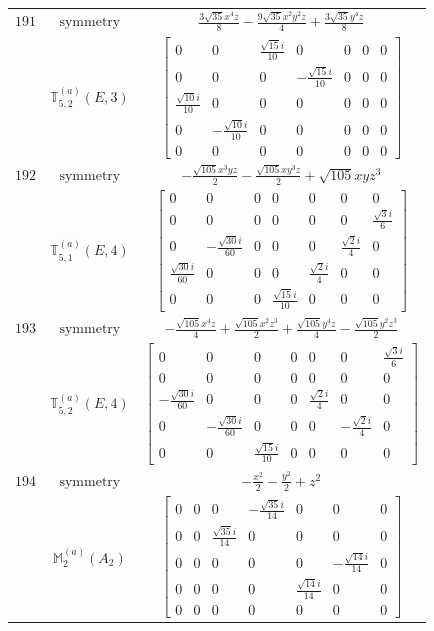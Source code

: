 \documentclass[fleqn,8pt,landscape]{jsarticle}
\begin{document}
\begin{longtable}{ccc}
$ 191 $ & $ \text{symmetry} $ & $ \frac{3 \sqrt{35} x^{4} z}{8} - \frac{9 \sqrt{35} x^{2} y^{2} z}{4} + \frac{3 \sqrt{35} y^{4} z}{8} $ \\
$  $ & $ \mathbb{T}_{5,2}^{(a)}(E,3) $ & $ \begin{bmatrix} 0 & 0 & \frac{\sqrt{15} i}{10} & 0 & 0 & 0 & 0 \\ 0 & 0 & 0 & - \frac{\sqrt{15} i}{10} & 0 & 0 & 0 \\ \frac{\sqrt{10} i}{10} & 0 & 0 & 0 & 0 & 0 & 0 \\ 0 & - \frac{\sqrt{10} i}{10} & 0 & 0 & 0 & 0 & 0 \\ 0 & 0 & 0 & 0 & 0 & 0 & 0 \end{bmatrix} $ \\ \hline
$ 192 $ & $ \text{symmetry} $ & $ - \frac{\sqrt{105} x^{3} y z}{2} - \frac{\sqrt{105} x y^{3} z}{2} + \sqrt{105} x y z^{3} $ \\
$  $ & $ \mathbb{T}_{5,1}^{(a)}(E,4) $ & $ \begin{bmatrix} 0 & 0 & 0 & 0 & 0 & 0 & 0 \\ 0 & 0 & 0 & 0 & 0 & 0 & \frac{\sqrt{3} i}{6} \\ 0 & - \frac{\sqrt{30} i}{60} & 0 & 0 & 0 & \frac{\sqrt{2} i}{4} & 0 \\ \frac{\sqrt{30} i}{60} & 0 & 0 & 0 & \frac{\sqrt{2} i}{4} & 0 & 0 \\ 0 & 0 & 0 & \frac{\sqrt{15} i}{10} & 0 & 0 & 0 \end{bmatrix} $ \\ \hline
$ 193 $ & $ \text{symmetry} $ & $ - \frac{\sqrt{105} x^{4} z}{4} + \frac{\sqrt{105} x^{2} z^{3}}{2} + \frac{\sqrt{105} y^{4} z}{4} - \frac{\sqrt{105} y^{2} z^{3}}{2} $ \\
$  $ & $ \mathbb{T}_{5,2}^{(a)}(E,4) $ & $ \begin{bmatrix} 0 & 0 & 0 & 0 & 0 & 0 & \frac{\sqrt{3} i}{6} \\ 0 & 0 & 0 & 0 & 0 & 0 & 0 \\ - \frac{\sqrt{30} i}{60} & 0 & 0 & 0 & \frac{\sqrt{2} i}{4} & 0 & 0 \\ 0 & - \frac{\sqrt{30} i}{60} & 0 & 0 & 0 & - \frac{\sqrt{2} i}{4} & 0 \\ 0 & 0 & \frac{\sqrt{15} i}{10} & 0 & 0 & 0 & 0 \end{bmatrix} $ \\ \hline
$ 194 $ & $ \text{symmetry} $ & $ - \frac{x^{2}}{2} - \frac{y^{2}}{2} + z^{2} $ \\
$  $ & $ \mathbb{M}_{2}^{(a)}(A_{2}) $ & $ \begin{bmatrix} 0 & 0 & 0 & - \frac{\sqrt{35} i}{14} & 0 & 0 & 0 \\ 0 & 0 & \frac{\sqrt{35} i}{14} & 0 & 0 & 0 & 0 \\ 0 & 0 & 0 & 0 & 0 & - \frac{\sqrt{14} i}{14} & 0 \\ 0 & 0 & 0 & 0 & \frac{\sqrt{14} i}{14} & 0 & 0 \\ 0 & 0 & 0 & 0 & 0 & 0 & 0 \end{bmatrix} $ \\ \hline

\end{longtable}
\end{document}
